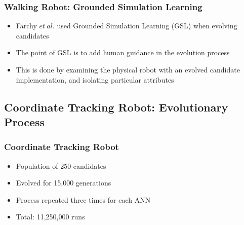 \documentclass{beamer}
\begin{document}
\begin{frame}
  \frametitle{Walking Robot: Grounded Simulation Learning}
  \begin{itemize}
  \item Farchy $et~al.$ used Grounded Simulation Learning (GSL) when evolving candidates
  \item The point of GSL is to add human guidance in the evolution process
  \item This is done by examining the physical robot with an evolved candidate implementation, and isolating particular attributes
  \end{itemize}
\end{frame}

\subsection*{Coordinate Tracking Robot: Evolutionary Process}
\begin{frame}
  \frametitle{Coordinate Tracking Robot}
  \begin{itemize}
   \item Population of 250 candidates
   \item Evolved for 15,000 generations
   \item Process repeated three times for each ANN
   \item Total: 11,250,000 runs

  \end{itemize}
\end{frame}
\end{document}
